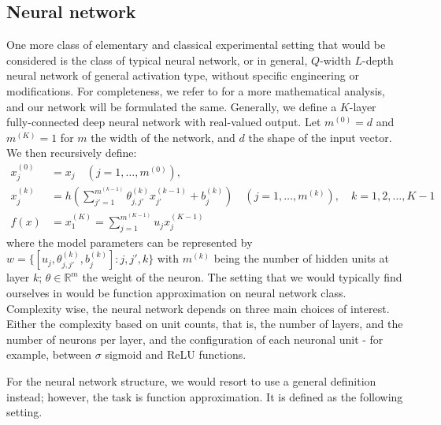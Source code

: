 \documentclass{article}
\begin{document}
\clearpage

\subsection{Neural network}

One more class of elementary and classical experimental setting that would be considered is the class of typical neural network, or in general, $Q$-width $L$-depth neural network of general activation type, without specific engineering or modifications. For completeness, we refer to \cite{zhang2023mathematical} for a more mathematical analysis, and our network will be formulated the same. Generally, we define a $K$-layer fully-connected deep neural network with real-valued output. Let $m^{(0)}=d$ and $m^{(K)}=1$ for $m$ the width of the network, and $d$ the shape of the input vector. We then recursively define: 
\begin{align}
    x_{j}^{(0)} &= x_{j} \quad (j=1,\dots,m^{(0)}),\\ 
    x_{j}^{(k)} &= h\left(\sum^{m^{(k-1)}}_{j'=1} \theta_{j,j'}^{(k)}x_{j'}^{(k-1)}+ b_{j}^{(k)}\right)\quad (j=1,\dots,m^{(k)}), \quad k = 1,2,\dots,K-1\\
    f(x) & = x_{1}^{(K)} = \sum^{m^{(K-1)}}_{j=1} u_{j}x_{j}^{(K-1)}
\end{align}
where the model parameters can be represented by $w=\{[u_{j}, \theta_{j,j'}^{(k)}, b_{j}^{(k)}]: j,j',k\}$ with $m^{(k)}$ being the number of hidden units at layer $k$; $\theta\in \mathbb{R}^{m}$ the weight of the neuron. The setting that we would typically find ourselves in would be function approximation on neural network class. Complexity wise, the neural network depends on three main choices of interest. Either the complexity based on unit counts, that is, the number of layers, and the number of neurons per layer, and the configuration of each neuronal unit - for example, between $\sigma$ sigmoid and ReLU functions. 

For the neural network structure, we would resort to use a general definition instead; however, the task is function approximation. It is defined as the following setting. 
\vspace{2mm}
\end{document}
